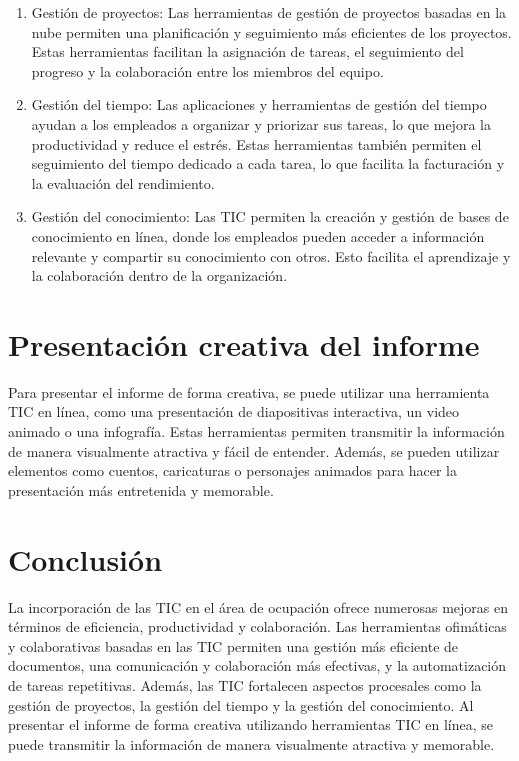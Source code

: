 \documentclass{article}
\theoremstyle{mytheoremstyle}
\theoremstyle{mytheoremstyle}
\theoremstyle{myproblemstyle}
\begin{document}
\begin{enumerate}
  \item Gestión de proyectos: Las herramientas de gestión de proyectos basadas en la nube permiten una planificación y seguimiento más eficientes de los proyectos. Estas herramientas facilitan la asignación de tareas, el seguimiento del progreso y la colaboración entre los miembros del equipo.
  
  \item Gestión del tiempo: Las aplicaciones y herramientas de gestión del tiempo ayudan a los empleados a organizar y priorizar sus tareas, lo que mejora la productividad y reduce el estrés. Estas herramientas también permiten el seguimiento del tiempo dedicado a cada tarea, lo que facilita la facturación y la evaluación del rendimiento.
  
  \item Gestión del conocimiento: Las TIC permiten la creación y gestión de bases de conocimiento en línea, donde los empleados pueden acceder a información relevante y compartir su conocimiento con otros. Esto facilita el aprendizaje y la colaboración dentro de la organización.
\end{enumerate}

\section{Presentación creativa del informe}

Para presentar el informe de forma creativa, se puede utilizar una herramienta TIC en línea, como una presentación de diapositivas interactiva, un video animado o una infografía. Estas herramientas permiten transmitir la información de manera visualmente atractiva y fácil de entender. Además, se pueden utilizar elementos como cuentos, caricaturas o personajes animados para hacer la presentación más entretenida y memorable.

\section{Conclusión}

La incorporación de las TIC en el área de ocupación ofrece numerosas mejoras en términos de eficiencia, productividad y colaboración. Las herramientas ofimáticas y colaborativas basadas en las TIC permiten una gestión más eficiente de documentos, una comunicación y colaboración más efectivas, y la automatización de tareas repetitivas. Además, las TIC fortalecen aspectos procesales como la gestión de proyectos, la gestión del tiempo y la gestión del conocimiento. Al presentar el informe de forma creativa utilizando herramientas TIC en línea, se puede transmitir la información de manera visualmente atractiva y memorable.
\end{document}
